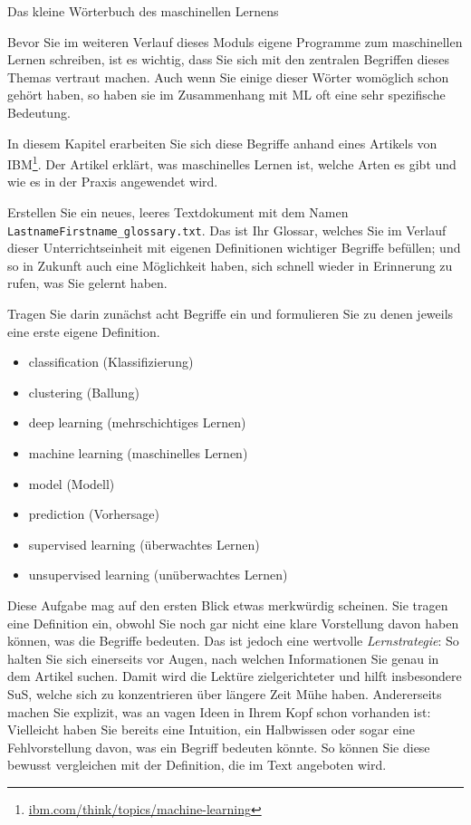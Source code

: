 \label{sec:begriffe}
\begin{lpu}{Das kleine Wörterbuch des maschinellen Lernens}

Bevor Sie im weiteren Verlauf dieses Moduls eigene Programme zum maschinellen Lernen schreiben, ist es wichtig, dass Sie sich mit den zentralen Begriffen dieses Themas vertraut machen. Auch wenn Sie einige dieser Wörter womöglich schon gehört haben, so haben sie im Zusammenhang mit ML oft eine sehr spezifische Bedeutung.

In diesem Kapitel erarbeiten Sie sich diese Begriffe anhand eines Artikels von IBM\footnote{\href{https://www.ibm.com/think/topics/machine-learning}{\url{ibm.com/think/topics/machine-learning}}}. Der Artikel erklärt, was maschinelles Lernen ist, welche Arten es gibt und wie es in der Praxis angewendet wird.

\begin{aufgabe}{1}
Erstellen Sie ein neues, leeres Textdokument mit dem Namen \texttt{LastnameFirstname\_glossary.txt}. Das ist Ihr Glossar, welches Sie im Verlauf dieser Unterrichtseinheit mit eigenen Definitionen wichtiger Begriffe befüllen; und so in Zukunft auch eine Möglichkeit haben, sich schnell wieder in Erinnerung zu rufen, was Sie gelernt haben.

Tragen Sie darin zunächst acht Begriffe ein und formulieren Sie zu denen jeweils eine erste eigene Definition.

\newpage

\begin{itemize}[noitemsep]
  \item classification (Klassifizierung)
  \item clustering (Ballung)
  \item deep learning (mehrschichtiges Lernen)
  \item machine learning (maschinelles Lernen)
  \item model (Modell)
  \item prediction (Vorhersage)
  \item supervised learning (überwachtes Lernen)
  \item unsupervised learning (unüberwachtes Lernen)
\end{itemize}

\end{aufgabe}

Diese Aufgabe mag auf den ersten Blick etwas merkwürdig scheinen. Sie tragen eine Definition ein, obwohl Sie noch gar nicht eine klare Vorstellung davon haben können, was die Begriffe bedeuten. Das ist jedoch eine wertvolle \textit{Lernstrategie}: So halten Sie sich einerseits vor Augen, nach welchen Informationen Sie genau in dem Artikel suchen. Damit wird die Lektüre zielgerichteter und hilft insbesondere SuS, welche sich zu konzentrieren über längere Zeit Mühe haben. Andererseits machen Sie explizit, was an vagen Ideen in Ihrem Kopf schon vorhanden ist: Vielleicht haben Sie bereits eine Intuition, ein Halbwissen oder sogar eine Fehlvorstellung davon, was ein Begriff bedeuten könnte. So können Sie diese bewusst vergleichen mit der Definition, die im Text angeboten wird.


\end{lpu}
